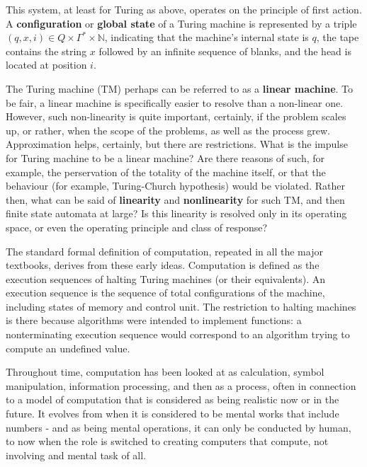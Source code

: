 This system, at least for Turing as above, operates on the principle of first action. A \textbf{configuration} or \textbf{global state} of a Turing machine is represented by a triple $(q,x,i)\in Q\times \Gamma^{*}\times \mathbb{N}$, indicating that the machine's internal state is $q$, the tape contains the string $x$ followed by an infinite sequence of blanks, and the head is located at position $i$. 

\begin{interject}[TM, II]
    The Turing machine (TM) perhaps can be referred to as a \textbf{linear machine}. To be fair, a linear machine is specifically easier to resolve than a non-linear one. However, such non-linearity is quite important, certainly, if the problem scales up, or rather, when the scope of the problems, as well as the process grew. Approximation helps, certainly, but there are restrictions. What is the impulse for Turing machine to be a linear machine? Are there reasons of such, for example, the perservation of the totality of the machine itself, or that the behaviour (for example, Turing-Church hypothesis) would be violated. Rather then, what can be said of \textbf{linearity} and \textbf{nonlinearity} for such TM, and then finite state automata at large? Is this linearity is resolved only in its operating space, or even the operating principle and class of response? 
\end{interject}

\begin{displayquote}
    The standard formal definition of computation, repeated in all the major textbooks, derives from these early ideas. Computation is defined as the execution sequences of halting Turing machines (or their equivalents). An execution sequence is the sequence of total configurations of the machine, including states of memory and control unit. The restriction to halting machines is there because algorithms were intended to implement functions: a nonterminating execution sequence would correspond to an algorithm trying to compute an undefined value.
\end{displayquote}

Throughout time, computation has been looked at as calculation, symbol manipulation, information processing, and then as a process, often in connection to a model of computation that is considered as being realistic now or in the future. It evolves from when it is considered to be mental works that include numbers - and as being mental operations, it can only be conducted by human, to now when the role is switched to creating computers that compute, not involving and mental task of all. 


